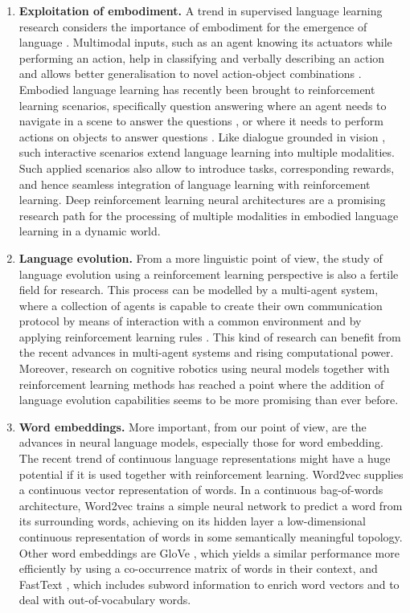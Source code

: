 \begin{enumerate}
\item {\bf Exploitation of embodiment.}
A trend in supervised language learning research considers the importance of embodiment for the emergence of language .
Multimodal inputs, such as an agent knowing its actuators while performing an action, help in classifying and verbally describing an action and allows better generalisation to novel action-object combinations .
Embodied language learning has recently been brought to reinforcement learning scenarios, specifically question answering where an agent needs to navigate in a scene to answer the questions , or where it needs to perform actions on objects to answer questions .
Like dialogue grounded in vision , such interactive scenarios extend language learning into multiple modalities. Such applied scenarios also allow to introduce tasks, corresponding rewards, and hence seamless integration of language learning with reinforcement learning.
Deep reinforcement learning neural architectures are a promising research path for the processing of multiple modalities in embodied language learning in a dynamic world.
\item {\bf Language evolution.}
From a more linguistic point of view, the study of language evolution using a reinforcement learning perspective is also a fertile field for research. This process can be modelled by a multi-agent system, where a collection of agents is capable to create their own communication protocol by means of interaction with a common environment and by applying reinforcement learning rules . This kind of research can benefit from the recent advances in multi-agent systems and rising computational power. Moreover, research on cognitive robotics using neural models together with reinforcement learning methods  has reached a point where the addition of language evolution capabilities seems to be more promising than ever before.
\item {\bf Word embeddings.}
More important, from our point of view, are the advances in neural language models, especially those for word embedding. The recent trend of continuous language representations might have a huge potential if it is used together with reinforcement learning. Word2vec  supplies a continuous vector  representation of words. In a continuous bag-of-words architecture,  Word2vec trains a simple neural network to predict a word from its surrounding words, achieving on its hidden layer a low-dimensional  continuous representation of words in some semantically meaningful  topology. Other word embeddings are GloVe , which  yields a similar performance more efficiently by using a co-occurrence  matrix of words in their context, and FastText ,  which includes subword information to enrich word vectors and to deal  with out-of-vocabulary words.

\end{enumerate}
